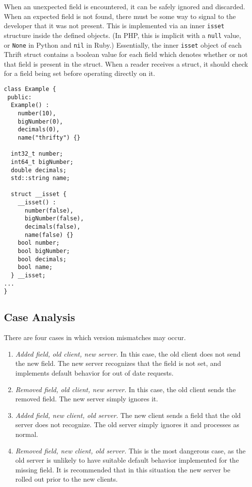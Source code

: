 \documentclass[nocopyrightspace,blockstyle]{sigplanconf}
\begin{document}
When an unexpected field is encountered, it can be safely ignored and
discarded. When an expected field is not found, there must be some way to
signal to the developer that it was not present. This is implemented via an
inner \texttt{isset} structure inside the defined objects. (In PHP, this is
implicit with a \texttt{null} value, or \texttt{None} in Python
and \texttt{nil} in Ruby.) Essentially,
the inner \texttt{isset} object of each Thrift struct contains a boolean value
for each field which denotes whether or not that field is present in the
struct. When a reader receives a struct, it should check for a field being set
before operating directly on it.

\begin{verbatim}
class Example {
 public:
  Example() :
    number(10),
    bigNumber(0),
    decimals(0),
    name("thrifty") {} 

  int32_t number;
  int64_t bigNumber;
  double decimals;
  std::string name;

  struct __isset {
    __isset() :
      number(false),
      bigNumber(false),
      decimals(false),
      name(false) {}
    bool number;
    bool bigNumber;
    bool decimals;
    bool name;
  } __isset;
...
}
\end{verbatim} 

\subsection{Case Analysis}

There are four cases in which version mismatches may occur.

\begin{enumerate}
\item \textit{Added field, old client, new server.} In this case, the old
client does not send the new field. The new server recognizes that the field
is not set, and implements default behavior for out of date requests.
\item \textit{Removed field, old client, new server.} In this case, the old
client sends the removed field. The new server simply ignores it.
\item \textit{Added field, new client, old server.} The new client sends a
field that the old server does not recognize. The old server simply ignores
it and processes as normal.
\item \textit{Removed field, new client, old server.} This is the most
dangerous case, as the old server is unlikely to have suitable default
behavior implemented for the missing field. It is recommended that in this
situation the new server be rolled out prior to the new clients.
\end{enumerate}
\end{document}
